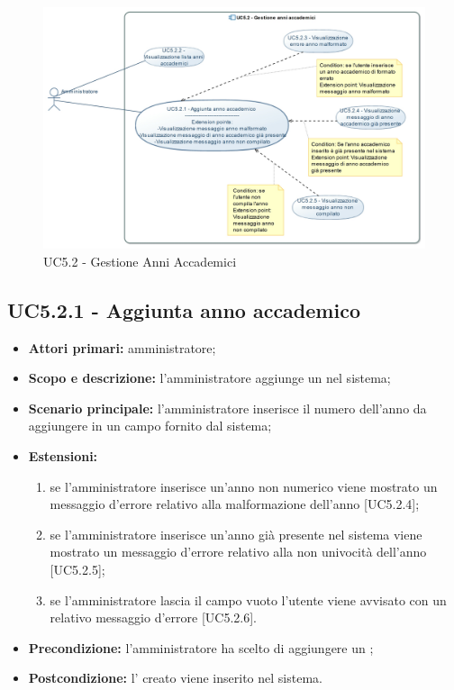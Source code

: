 \documentclass[AnalisiDeiRequisiti.tex]{subfiles}
\begin{document}
\begin{figure}[H]
	\centering
	\includegraphics[width=1.0\linewidth]{UC5_2.jpg}
	\caption{UC5.2 - Gestione Anni Accademici}
	\label{fig:UC5.2 - Gestione Anni Accademici}
\end{figure}

\subsection{UC5.2.1 - Aggiunta anno accademico}
\begin{itemize}
	\item \textbf{Attori primari:} amministratore;
	\item \textbf{Scopo e descrizione:} l'amministratore aggiunge un  nel sistema;
	\item \textbf{Scenario principale:} l'amministratore inserisce il numero dell'anno da aggiungere in un campo fornito dal sistema;
	\item \textbf{Estensioni:}
	\begin{enumerate}
		\item se l'amministratore inserisce un'anno non numerico viene mostrato un messaggio d'errore relativo alla malformazione dell'anno [UC5.2.4];
		\item se l'amministratore inserisce un'anno già presente nel sistema viene mostrato un messaggio d'errore relativo alla non univocità dell'anno [UC5.2.5];
		\item se l'amministratore lascia il campo vuoto l'utente viene avvisato con un relativo messaggio d'errore [UC5.2.6].
	\end{enumerate}
	\item \textbf{Precondizione:} l'amministratore ha scelto di aggiungere un ; 
	\item \textbf{Postcondizione:} l' creato viene inserito nel sistema.
\end{itemize}
\end{document}
